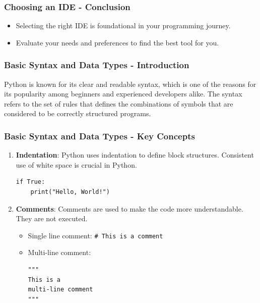 \documentclass{beamer}
\begin{document}
\begin{frame}[fragile]
    \frametitle{Choosing an IDE - Conclusion}
    \begin{itemize}
        \item Selecting the right IDE is foundational in your programming journey.
        \item Evaluate your needs and preferences to find the best tool for you.
    \end{itemize}
\end{frame}

\begin{frame}[fragile]
    \frametitle{Basic Syntax and Data Types - Introduction}
    Python is known for its clear and readable syntax, which is one of the reasons for its popularity among beginners and experienced developers alike. 
    The syntax refers to the set of rules that defines the combinations of symbols that are considered to be correctly structured programs.
\end{frame}

\begin{frame}[fragile]
    \frametitle{Basic Syntax and Data Types - Key Concepts}
    \begin{enumerate}
        \item \textbf{Indentation}: Python uses indentation to define block structures. Consistent use of white space is crucial in Python.
        \begin{lstlisting}
if True:
    print("Hello, World!")
        \end{lstlisting}

        \item \textbf{Comments}: Comments are used to make the code more understandable. They are not executed.
        \begin{itemize}
            \item Single line comment: \texttt{\# This is a comment}
            \item Multi-line comment: 
            \begin{lstlisting}
"""
This is a 
multi-line comment
"""
            \end{lstlisting}
        \end{itemize}
    \end{enumerate}
\end{frame}
\end{document}
